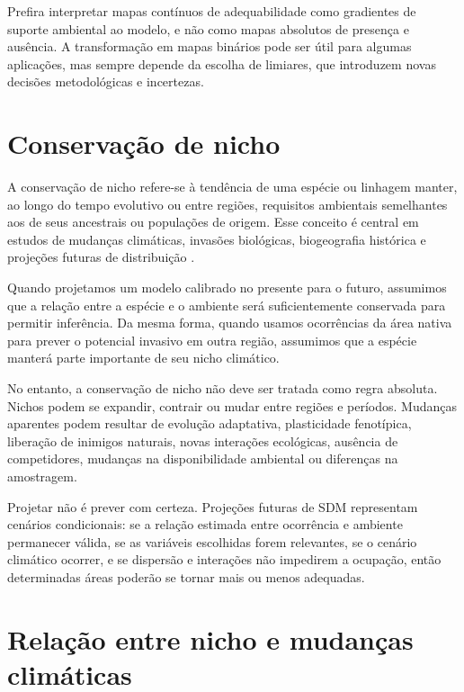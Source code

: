 \documentclass{ueap-sdm}
\begin{document}
\begin{dica}
Prefira interpretar mapas contínuos de adequabilidade como gradientes de suporte ambiental ao modelo, e não como mapas absolutos de presença e ausência. A transformação em mapas binários pode ser útil para algumas aplicações, mas sempre depende da escolha de limiares, que introduzem novas decisões metodológicas e incertezas.
\end{dica}

\section{Conservação de nicho}

A conservação de nicho refere-se à tendência de uma espécie ou linhagem manter, ao longo do tempo evolutivo ou entre regiões, requisitos ambientais semelhantes aos de seus ancestrais ou populações de origem. Esse conceito é central em estudos de mudanças climáticas, invasões biológicas, biogeografia histórica e projeções futuras de distribuição \parencite{peterson2011,guisan2017habitat,raes2018modeling}.

Quando projetamos um modelo calibrado no presente para o futuro, assumimos que a relação entre a espécie e o ambiente será suficientemente conservada para permitir inferência. Da mesma forma, quando usamos ocorrências da área nativa para prever o potencial invasivo em outra região, assumimos que a espécie manterá parte importante de seu nicho climático.

No entanto, a conservação de nicho não deve ser tratada como regra absoluta. Nichos podem se expandir, contrair ou mudar entre regiões e períodos. Mudanças aparentes podem resultar de evolução adaptativa, plasticidade fenotípica, liberação de inimigos naturais, novas interações ecológicas, ausência de competidores, mudanças na disponibilidade ambiental ou diferenças na amostragem.

\begin{atencao}
Projetar não é prever com certeza. Projeções futuras de SDM representam cenários condicionais: se a relação estimada entre ocorrência e ambiente permanecer válida, se as variáveis escolhidas forem relevantes, se o cenário climático ocorrer, e se dispersão e interações não impedirem a ocupação, então determinadas áreas poderão se tornar mais ou menos adequadas.
\end{atencao}

\section{Relação entre nicho e mudanças climáticas}
\end{document}
